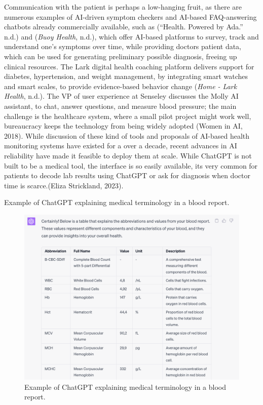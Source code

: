 \documentclass[
  letterpaper,
  DIV=11,
  numbers=noendperiod]{scrartcl}
\begin{document}
Communication with the patient is perhaps a low-hanging fruit, as there
are numerous examples of AI-driven symptom checkers and AI-based
FAQ-answering chatbots already commercially available, such as
({``Health. {Powered} by {Ada}.''} n.d.) and (\emph{Buoy {Health}},
n.d.), which offer AI-based platforms to survey, track and understand
one's symptoms over time, while providing doctors patient data, which
can be used for generating preliminary possible diagnosis, freeing up
clinical resources. The Lark digital health coaching platform delivers
support for diabetes, hypertension, and weight management, by
integrating smart watches and smart scales, to provide evidence-based
behavior change (\emph{Home - {Lark Health}}, n.d.). The VP of user
experience at Senseley discusses the Molly AI assistant, to chat, answer
questions, and measure blood pressure; the main challenge is the
healthcare system, where a small pilot project might work well,
bureaucracy keeps the technology from being widely adopted (Women in AI,
2018). While discussion of these kind of tools and proposals of AI-based
health monitoring systems have existed for a over a decade, recent
advances in AI reliability have made it feasible to deploy them at
scale. While ChatGPT is not built to be a medical tool, the interface is
so easily available, its very common for patients to decode lab results
using ChatGPT or ask for diagnosis when doctor time is scarce.(Eliza
Strickland, 2023).

Example of ChatGPT explaining medical terminology in a blood report.

\begin{figure}[H]

{\centering \includegraphics[width=1\linewidth,height=\textheight,keepaspectratio]{./images/ai/chatgpt-medical.png}

}

\caption{Example of ChatGPT explaining medical terminology in a blood
report.}

\end{figure}%
\end{document}
